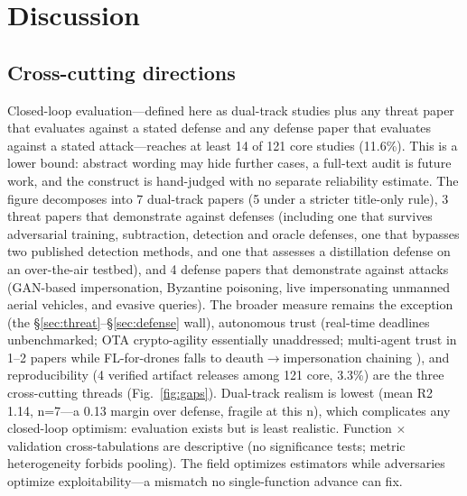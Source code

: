 \section{Discussion}
\subsection{Cross-cutting directions}
\label{sec:cross}
Closed-loop evaluation---defined here as dual-track studies plus any threat paper that
evaluates against a stated defense and any defense paper that evaluates against a stated
attack---reaches at least 14 of 121 core studies (11.6\%). This is a lower bound: abstract
wording may hide further cases, a full-text audit is future work, and the construct is
hand-judged with no separate reliability estimate. The figure decomposes into 7 dual-track
papers  (5 under a stricter title-only rule), 3 threat papers that demonstrate against defenses
(including one that survives adversarial training, subtraction, detection and oracle defenses,
one that bypasses two published detection methods, and one that assesses a distillation defense
on an over-the-air testbed), and 4 defense papers that demonstrate against attacks (GAN-based
impersonation, Byzantine poisoning, live impersonating unmanned aerial vehicles, and evasive
queries). The broader measure remains the exception (the \S\ref{sec:threat}--\S\ref{sec:defense} wall), autonomous trust (real-time deadlines unbenchmarked; OTA crypto-agility essentially unaddressed; multi-agent trust in 1--2 papers while FL-for-drones falls to deauth$\rightarrow$impersonation chaining ), and reproducibility (4 verified artifact releases among 121 core, 3.3\%) are the three cross-cutting threads (Fig.~\ref{fig:gaps}). Dual-track realism is lowest (mean R2 1.14, n=7---a 0.13 margin over defense, fragile at this n), which complicates any closed-loop optimism: evaluation exists but is least realistic. Function $\times$ validation cross-tabulations are descriptive (no significance tests; metric heterogeneity forbids pooling). The field optimizes estimators while adversaries optimize exploitability---a mismatch no single-function advance can fix.

